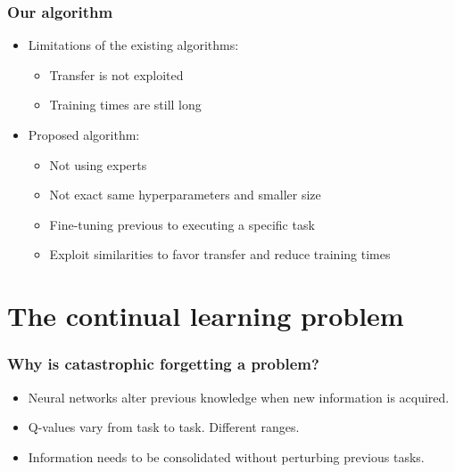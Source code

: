 \documentclass{beamer}
\theoremstyle{remark}
\theoremstyle{plain}
\begin{document}
\begin{frame}
\frametitle{Our algorithm}
\begin{itemize}
    \item Limitations of the existing algorithms:
    \begin{itemize}
        \item Transfer is not exploited
        \item Training times are still long
    \end{itemize}
\item Proposed algorithm:
        \begin{itemize}
            \item Not using experts
            \item Not exact same hyperparameters and smaller size
            \item Fine-tuning previous to executing a specific task
            \item Exploit similarities to favor transfer and reduce training times
        \end{itemize}
\end{itemize}
    
\end{frame}
\section{The continual learning problem}
\label{sec:continual}

\begin{frame}
 \frametitle{Why is catastrophic forgetting a problem?}
  \begin{itemize}
      \item Neural networks alter previous knowledge when new information is acquired.
      \item Q-values vary from task to task. Different ranges.
      \item Information needs to be consolidated without perturbing previous tasks.
  \end{itemize}
\end{frame}
\end{document}
